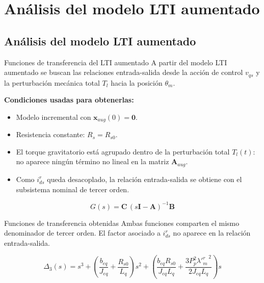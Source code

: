 \documentclass[aspectratio=169,t]{beamer}
\newcommand{\SecPresentacion}{Presentación del problema}
\newcommand{\SecMecanico}{Subsistema mecánico equivalente}
\newcommand{\SecElectromagnetico}{Subsistema electromagnético en coordenadas qd0}
\newcommand{\SecTermico}{Subsistema térmico}
\newcommand{\SecNLGlobal}{Sistema No Lineal Global}
\newcommand{\SecLPV}{Linealización Jacobiana (LPV)}
\newcommand{\SecLTI}{Obtención del modelo LTI equivalente}
\newcommand{\SecAnalisisLTI}{Análisis del modelo LTI aumentado}
\newcommand{\SecDinamica}{Respuesta dinámica en dominio del tiempo}
\newcommand{\SecControlador}{Diseño y análisis del controlador en cascada}
\newcommand{\SecVerifSpecs}{Verificación de desempeño: Especificaciones de operación}
\newcommand{\SecVerifOffset}{Verificación de desempeño: Offset de estado estacionario}
\newcommand{\SecVerifNoIdealidades}{Verificación de desempeño: No idealidades y comportamiento térmico}
\newcommand{\SecDiscretizacion}{Discretización del controlador}
\newcommand{\SecSoftware}{Codificación del software de control}
\newcommand{\AgendaItem}[3]{%
  \ifnum#1=#2
    {\scriptsize\bfseries\color{uncBlue}%
      \hyperlink{sec:#1}{\makebox[2.2em][r]{#1.}\hspace{0.7em}%
      \parbox[t]{0.86\textwidth}{#3}}\par}%
  \else
    {\scriptsize\color{black!26}%
      \hyperlink{sec:#1}{\makebox[2.2em][r]{#1.}\hspace{0.7em}%
      \parbox[t]{0.86\textwidth}{#3}}\par}%
  \fi
  \vspace{0.35mm}%
}
\newcommand{\AgendaBody}[1]{%
    \vspace{3mm}
    {\Large\bfseries\color{uncBlue}Tabla de contenidos\par}
    \vspace{2mm}
    \begin{minipage}{0.94\textwidth}
      \AgendaItem{1}{#1}{\SecPresentacion}
      \AgendaItem{2}{#1}{\SecMecanico}
      \AgendaItem{3}{#1}{\SecElectromagnetico}
      \AgendaItem{4}{#1}{\SecTermico}
      \AgendaItem{5}{#1}\SecNLGlobal
      \AgendaItem{6}{#1}{\SecLPV}
      \AgendaItem{7}{#1}{\SecLTI}
      \AgendaItem{8}{#1}{\SecAnalisisLTI}
      \AgendaItem{9}{#1}{\SecDinamica}
      \AgendaItem{10}{#1}{\SecControlador}
      \AgendaItem{11}{#1}{\SecVerifSpecs}
      \AgendaItem{12}{#1}{\SecVerifOffset}
      \AgendaItem{13}{#1}{\SecVerifNoIdealidades}
      \AgendaItem{14}{#1}{\SecDiscretizacion}
      \AgendaItem{15}{#1}{\SecSoftware}
    \end{minipage}
    \vfill
}
\newcommand{\AgendaSlideTarget}[2]{%
  \begin{frame}[plain]
    \hypertarget{#2}{}%
    \AgendaBody{#1}
  \end{frame}
}
\newcommand{\StartProjectSection}[2]{%
  \section{#2}%
  \subsection{#2}%
  \AgendaSlideTarget{#1}{sec:#1}%
}
\begin{document}
\StartProjectSection{8}{\SecAnalisisLTI}
\begin{frame}{Funciones de transferencia del LTI aumentado}
{\small\color{uncGray}A partir del modelo LTI aumentado se buscan las relaciones entrada-salida desde la acción de control $v_{qs}$ y la perturbación mecánica total $T_l$ hacia la posición $\theta_m$.}\par
\vspace{3mm}

\textbf{Condiciones usadas para obtenerlas:}
\begin{itemize}
  \item Modelo incremental con $\bm{x}_{aug}(0)=\bm{0}$.
  \item Resistencia constante: $R_s=R_{s0}$.
  \item El torque gravitatorio está agrupado dentro de la perturbación total $T_l(t)$: no aparece ningún término no lineal en la matriz $\bm{A}_{aug}$.
  \item Como $i_{ds}^{r}$ queda desacoplado, la relación entrada-salida se obtiene con el subsistema nominal de tercer orden.
\end{itemize}

\begin{equation*}
G(s)=\bm{C}\,(s\bm{I}-\bm{A})^{-1}\bm{B}
\end{equation*}
\end{frame}

\begin{frame}{Funciones de transferencia obtenidas}
{\small\color{uncGray}Ambas funciones comparten el mismo denominador de tercer orden. El factor asociado a $i_{ds}^{r}$ no aparece en la relación entrada-salida.}\par
\vspace{2mm}

\small
\begin{equation*}
\Delta_3(s)=
s^3+
\left(\frac{b_{eq}}{J_{eq}}+\frac{R_{s0}}{L_q}\right)s^2+
\left(\frac{b_{eq}R_{s0}}{J_{eq}L_q}+
\frac{3P_p^2{\lambda'^r_m}^{\,2}}{2J_{eq}L_q}\right)s
\end{equation*}

\vspace{2mm}
\normalsize


\end{frame}
\end{document}
